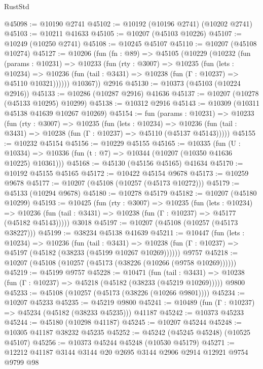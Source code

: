 \begin{lexlean}{RustStd}
\begin{coremodule}
@45098 := @10190 @2741
@45102 := @10192 (@10196 @2741) (@10202 @2741)
@45103 := @10211 @41633
@45105 := @10207 (@45103 @10226)
@45107 := @10249 (@10250 @2741)
@45108 := @10245 @45107
@45110 := @10207 (@45108 @10274)
@45127 := @10206
    (fun (fn : @89) =>
    @45105
      (@10229
        (@10232
          (fun (params : @10231) =>
          @10233
            (fun (rty : @3007) =>
            @10235
              (fun (lets : @10234) =>
              @10236 (fun (tail : @3431) => @10238 (fun (Γ : @10237) => @45110 @10321))))))
        @10367))
    @2916
@45130 := @10373 (@45103 (@10224 @2916))
@45133 := @10286 (@10287 @2916) @41636
@45137 := @10207 (@10278 (@45133 @10295) @10299)
@45138 := @10312 @2916
@45143 := @10309 (@10311 @45138 @41639 @10267 @10269)
@45154 := fun (params : @10231) =>
  @10233
    (fun (rty : @3007) =>
    @10235
      (fun (lets : @10234) =>
      @10236 (fun (tail : @3431) => @10238 (fun (Γ : @10237) => @45110 (@45137 @45143)))))
@45155 := @10232 @45154
@45156 := @10229 @45155
@45165 := @10335
    (fun (U : @10334) => @10336 (fun (t : @7) => @10344 (@10207 (@10350 @41636 @10225) @10361)))
@45168 := @45130 (@45156 @45165) @41634
@45170 := @10192 @45155 @45165
@45172 := @10422 @45154 @9678
@45173 := @10259 @9678
@45177 := @10207 (@45108 (@10257 (@45173 @10272)))
@45179 := @45133 (@10294 @9678)
@45180 := @10278 @45179
@45182 := @10207 (@45180 @10299)
@45193 := @10425
    (fun (rty : @3007) =>
    @10235
      (fun (lets : @10234) =>
      @10236 (fun (tail : @3431) => @10238 (fun (Γ : @10237) => @45177 (@45182 @45143)))))
    @3018
@45197 := @10207 (@45108 (@10257 (@45173 @38227)))
@45199 := @38234 @45138 @41639
@45211 := @10447
    (fun (lets : @10234) =>
    @10236
      (fun (tail : @3431) =>
      @10238 (fun (Γ : @10237) => @45197 (@45182 (@38233 (@45199 @10267 @10269))))))
    @9757
@45218 := @10207 (@45108 (@10257 (@45173 (@38226 (@10266 (@9758 @10269))))))
@45219 := @45199 @9757
@45228 := @10471
    (fun (tail : @3431) => @10238 (fun (Γ : @10237) => @45218 (@45182 (@38233 (@45219 @10269)))))
    @9800
@45233 := @45108 (@10257 (@45173 (@38226 (@10266 @9801))))
@45234 := @10207 @45233
@45235 := @45219 @9800
@45241 := @10489 (fun (Γ : @10237) => @45234 (@45182 (@38233 @45235))) @41187
@45242 := @10373 @45233
@45244 := @45180 (@10298 @41187)
@45245 := @10207 @45244
@45248 := @10305 @41187 @38232 @45235
@45252 := @45242 (@45245 @45248) (@10525 @45107)
@45256 := @10373 @45244 @45248 (@10530 @45179)
@45271 := @12212
    @41187
    @3144
    @3144
    @20
    @2695
    @3144
    @2906
    @2914
    @12921
    @9754
    @9799
    @98

\end{coremodule}
\end{lexlean}
